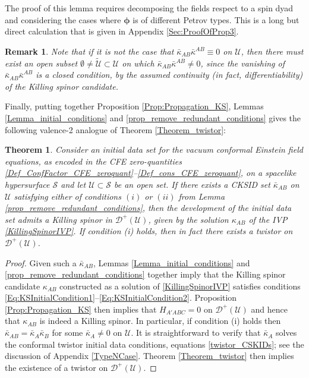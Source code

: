 \documentclass[10pt,a4paper]{article}
\theoremstyle{plain}
\newtheorem{theorem}{Theorem}
\newtheorem{remark}{Remark}
\begin{document}
The proof of this lemma requires decomposing the fields respect to a spin dyad
and considering the cases where $\bm\phi$ is of different Petrov types.
This is a long but direct calculation that is given in Appendix \ref{Sec:ProofOfProp3}.
\begin{remark}{\em 
Note that if it is not the case that $\bar{\kappa}_{AB}\bar{\kappa}^{AB}\equiv 0$ on
$\mathcal{U}$, then there must exist an open subset
$\emptyset\neq \tilde{\mathcal{U}}\subset\mathcal{U}$ on which
$\bar{\kappa}_{AB}\bar{\kappa}^{AB}\neq 0$, since the vanishing of
$\bar{\kappa}_{AB}\bar{\kappa}^{AB}$ is a closed condition, by the assumed
continuity (in fact, differentiability) of the Killing spinor
candidate. }
\end{remark}

\noindent
Finally, putting together Proposition
\ref{Prop:Propagation_KS}, Lemmas \ref{Lemma_initial_conditions} and \ref{prop_remove_redundant_conditions}
gives the following valence-2 analogue of Theorem \ref{Theorem_twistor}:
\begin{theorem}\label{Theorem_KS}
Consider an initial data set for the vacuum conformal Einstein
field equations, as encoded in the CFE zero-quantities
\eqref{Def_ConfFactor_CFE_zeroquant}--\eqref{Def_cons_CFE_zeroquant}, on a spacelike hypersurface $\mathcal{S}$ and let
$\mathcal{U}\subset\mathcal{S}$ be an open set.
If there exists a CKSID set $\bar{\kappa}_{AB}$ on $\mathcal{U}$ satisfying either of conditions $(i)$ or $(ii)$ from Lemma \ref{prop_remove_redundant_conditions}, then the development
of the initial data set admits a Killing spinor 
in $\mathcal{D}^+(\mathcal{U})$, given by the solution $\kappa_{AB}$ of the IVP \eqref{KillingSpinorIVP}. If condition (i) holds, then in fact there exists a twistor on $\mathcal{D}^+(\mathcal{U})$.  
\end{theorem}
\begin{proof}
Given such a $\bar{\kappa}_{AB}$, Lemmas \ref{Lemma_initial_conditions} and \ref{prop_remove_redundant_conditions} together imply that the Killing spinor candidate $\kappa_{AB}$ constructed as a solution of \eqref{KillingSpinorIVP} satisfies conditions \eqref{Eq:KSInitialCondition1}--\eqref{Eq:KSInitialCondition2}. Proposition \ref{Prop:Propagation_KS} then implies that $H_{A'ABC}=0$ on $\mathcal{D}^+(\mathcal{U})$ and hence that $\kappa_{AB}$ is indeed a Killing spinor. In particular, if condition (i) holds then $\bar{\kappa}_{AB}=\bar{\kappa}_A\bar{\kappa}_B$ for some $\bar{\kappa}_A\neq 0$ on $\mathcal{U}$. It is straightforward to verify that $\bar{\kappa}_A$ solves the conformal twistor initial data conditions, equations \eqref{twistor_CSKIDs}; see the discussion of Appendix \ref{TypeNCase}. Theorem \ref{Theorem_twistor} then implies the existence of a twistor on $\mathcal{D}^+(\mathcal{U})$. 
\end{proof}
\end{document}
